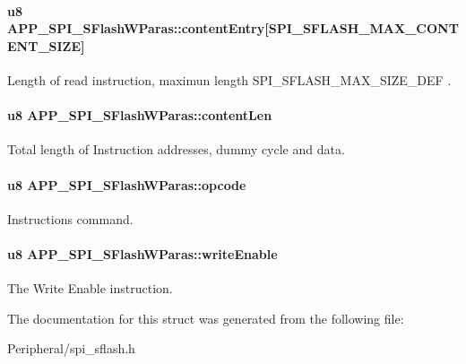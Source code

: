\paragraph[{\texorpdfstring{content\+Entry}{contentEntry}}]{\setlength{\rightskip}{0pt plus 5cm}u8 A\+P\+P\+\_\+\+S\+P\+I\+\_\+\+S\+Flash\+W\+Paras\+::content\+Entry\mbox{[}{\bf S\+P\+I\+\_\+\+S\+F\+L\+A\+S\+H\+\_\+\+M\+A\+X\+\_\+\+C\+O\+N\+T\+E\+N\+T\+\_\+\+S\+I\+ZE}\mbox{]}}\hypertarget{struct_a_p_p___s_p_i___s_flash_w_paras_aee95d3197b2d97d469d4be463f9079a6}{}\label{struct_a_p_p___s_p_i___s_flash_w_paras_aee95d3197b2d97d469d4be463f9079a6}
Length of read instruction, maximun length S\+P\+I\+\_\+\+S\+F\+L\+A\+S\+H\+\_\+\+M\+A\+X\+\_\+\+S\+I\+Z\+E\+\_\+\+D\+EF . 
\paragraph[{\texorpdfstring{content\+Len}{contentLen}}]{\setlength{\rightskip}{0pt plus 5cm}u8 A\+P\+P\+\_\+\+S\+P\+I\+\_\+\+S\+Flash\+W\+Paras\+::content\+Len}\hypertarget{struct_a_p_p___s_p_i___s_flash_w_paras_a40f0f54116eada6be4ee09e5a1604025}{}\label{struct_a_p_p___s_p_i___s_flash_w_paras_a40f0f54116eada6be4ee09e5a1604025}
Total length of Instruction addresses, dummy cycle and data. 
\paragraph[{\texorpdfstring{opcode}{opcode}}]{\setlength{\rightskip}{0pt plus 5cm}u8 A\+P\+P\+\_\+\+S\+P\+I\+\_\+\+S\+Flash\+W\+Paras\+::opcode}\hypertarget{struct_a_p_p___s_p_i___s_flash_w_paras_a76f3f5856e862e5229fc23433707add6}{}\label{struct_a_p_p___s_p_i___s_flash_w_paras_a76f3f5856e862e5229fc23433707add6}
Instructions command. 
\paragraph[{\texorpdfstring{write\+Enable}{writeEnable}}]{\setlength{\rightskip}{0pt plus 5cm}u8 A\+P\+P\+\_\+\+S\+P\+I\+\_\+\+S\+Flash\+W\+Paras\+::write\+Enable}\hypertarget{struct_a_p_p___s_p_i___s_flash_w_paras_a9d45b3d45f6f938d23d3cd32ddf8469e}{}\label{struct_a_p_p___s_p_i___s_flash_w_paras_a9d45b3d45f6f938d23d3cd32ddf8469e}
The Write Enable instruction. 

The documentation for this struct was generated from the following file\+:\begin{DoxyCompactItemize}
\item 
Peripheral/spi\+\_\+sflash.\+h\end{DoxyCompactItemize}
